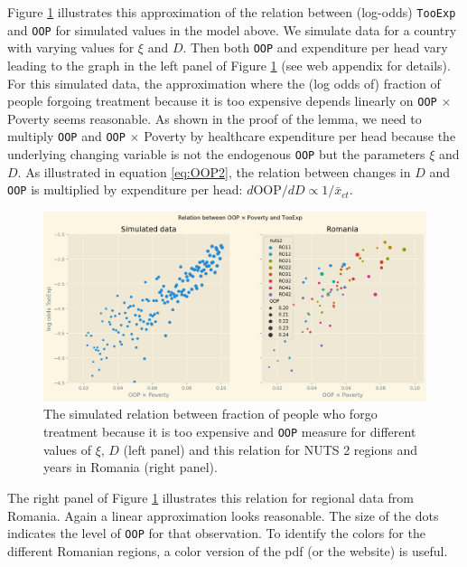 \documentclass[a4paper,12pt]{article}
\begin{document}
Figure \ref{fig:Parametric} illustrates this approximation of the relation between (log-odds) \texttt{TooExp} and \texttt{OOP} for simulated values in the model above. We simulate data for a country with varying values for \(\xi\) and \(D\). Then both \texttt{OOP} and expenditure per head vary leading to the graph in the left panel of Figure \ref{fig:Parametric} (see web appendix for details). For this simulated data, the approximation where the (log odds of) fraction of people forgoing treatment because it is too expensive depends linearly on \texttt{OOP} \(\times\) Poverty seems reasonable. As shown in the proof of the lemma, we need to multiply \texttt{OOP} and \texttt{OOP} \(\times\) Poverty by healthcare expenditure per head because the underlying changing variable is not the endogenous \texttt{OOP} but the parameters \(\xi\) and \(D\). As illustrated in equation \eqref{eq:OOP2}, the relation between changes in \(D\) and \texttt{OOP} is multiplied by expenditure per head: \(d \text{OOP}/d D \propto 1/\bar{x}_{ct}\).

\begin{figure}[htbp]
\centering
\includegraphics[width=.9\linewidth]{./figures/Parametric3.png}
\caption{\label{fig:Parametric}The simulated relation between fraction of people who forgo treatment because it is too expensive and \texttt{OOP} measure for different values of \(\xi\), \(D\) (left panel) and this relation for NUTS 2 regions and years in Romania (right panel).}
\end{figure}

The right panel of Figure \ref{fig:Parametric} illustrates this relation for regional data from Romania. Again a linear approximation looks reasonable. The size of the dots indicates the level of \texttt{OOP} for that observation. To identify the colors for the different Romanian regions, a color version of the pdf (or the website) is useful.
\end{document}
